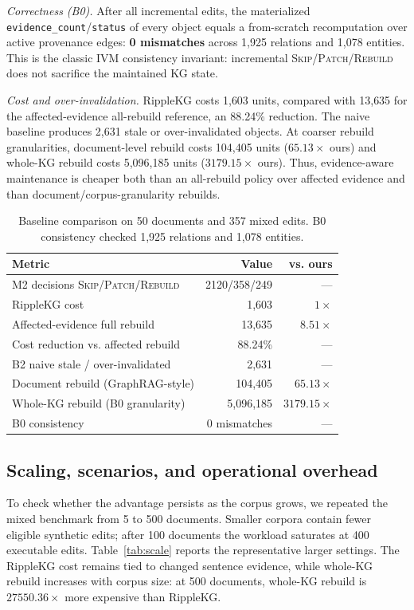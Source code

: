 \documentclass[conference]{IEEEtran}
\begin{document}
\emph{Correctness (B0).} After all incremental edits, the materialized
\texttt{evidence\_count}/\texttt{status} of every object equals a from-scratch
recomputation over active provenance edges: \textbf{0 mismatches} across 1{,}925
relations and 1{,}078 entities. This is the classic IVM consistency invariant:
incremental \textsc{Skip}/\textsc{Patch}/\textsc{Rebuild} does not sacrifice the
maintained KG state.

\emph{Cost and over-invalidation.} RippleKG costs 1{,}603 units, compared with
13{,}635 for the affected-evidence all-rebuild reference, an 88.24\% reduction.
The naive baseline produces 2{,}631 stale or over-invalidated objects. At coarser
rebuild granularities, document-level rebuild costs 104{,}405 units
($65.13\times$ ours) and whole-KG rebuild costs 5{,}096{,}185 units
($3179.15\times$ ours). Thus, evidence-aware maintenance is cheaper both than an
all-rebuild policy over affected evidence and than document/corpus-granularity
rebuilds.

\begin{table}[t]
\caption{Baseline comparison on 50 documents and 357 mixed edits. B0 consistency checked 1{,}925 relations and 1{,}078 entities.}
\label{tab:bench}
\centering
\footnotesize
\setlength{\tabcolsep}{3pt}
\begin{tabular}{lrr}
\toprule
\textbf{Metric} & \textbf{Value} & \textbf{vs. ours}\\
\midrule
M2 decisions \textsc{Skip}/\textsc{Patch}/\textsc{Rebuild} & 2120/358/249 & ---\\
RippleKG cost & 1{,}603 & $1\times$\\
Affected-evidence full rebuild & 13{,}635 & $8.51\times$\\
Cost reduction vs. affected rebuild & 88.24\% & ---\\
B2 naive stale / over-invalidated & 2{,}631 & ---\\
\midrule
Document rebuild (GraphRAG-style) & 104{,}405 & $65.13\times$\\
Whole-KG rebuild (B0 granularity) & 5{,}096{,}185 & $3179.15\times$\\
\midrule
B0 consistency & 0 mismatches & ---\\
\bottomrule
\end{tabular}
\end{table}

\subsection{Scaling, scenarios, and operational overhead}
To check whether the advantage persists as the corpus grows, we repeated the
mixed benchmark from 5 to 500 documents. Smaller corpora contain fewer eligible
synthetic edits; after 100 documents the workload saturates at 400 executable
edits. Table~\ref{tab:scale} reports the representative larger settings. The
RippleKG cost remains tied to changed sentence evidence, while whole-KG rebuild
increases with corpus size: at 500 documents, whole-KG rebuild is
$27550.36\times$ more expensive than RippleKG.
\end{document}
